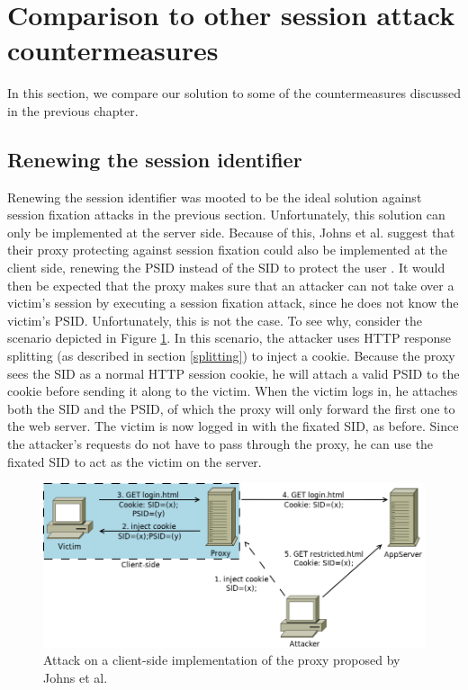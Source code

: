 \section{Comparison to other session attack countermeasures}\label{related-work}

In this section, we compare our solution to some of the countermeasures discussed in the previous chapter.

\subsection{Renewing the session identifier}

Renewing the session identifier was mooted to be the ideal solution against session fixation attacks in the previous section. Unfortunately, this solution can only be implemented at the server side. Because of this, Johns et al. suggest that their proxy protecting against session fixation could also be implemented at the client side, renewing the PSID instead of the SID to protect the user \cite{Johns2011}. It would then be expected that the proxy makes sure that an attacker can not take over a victim's session by executing a session fixation attack, since he does not know the victim's PSID. Unfortunately, this is not the case. To see why, consider the scenario depicted in Figure \ref{fig:johns-clientside}. In this scenario, the attacker uses HTTP response splitting (as described in section \ref{splitting}) to inject a cookie. Because the proxy sees the SID as a normal HTTP session cookie, he will attach a valid PSID to the cookie before sending it along to the victim. When the victim logs in, he attaches both the SID and the PSID, of which the proxy will only forward the first one to the web server. The victim is now logged in with the fixated SID, as before. Since the attacker's requests do not have to pass through the proxy, he can use the fixated SID to act as the victim on the server.

\begin{figure}[htb]
	\centering
	\includegraphics[scale=0.4]{img/johns-attack.png}
	\caption[Attack on a client-side implementation of Johns et al.]{Attack on a client-side implementation of the proxy proposed by Johns et al.}
	\label{fig:johns-clientside}
\end{figure}

